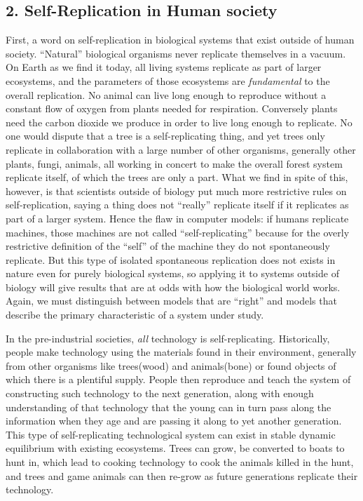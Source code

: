 \documentclass[12pt,a4paper]{amsart}
\numberwithin{equation}{section}
\begin{document}
\subsection{2. Self-Replication in Human
society}\label{self-replication-in-human-society}

First, a word on self-replication in biological systems that exist
outside of human society. ``Natural'' biological organisms never
replicate themselves in a vacuum. On Earth as we find it today, all
living systems replicate as part of larger ecosystems, and the
parameters of those ecosystems are \emph{fundamental} to the overall
replication. No animal can live long enough to reproduce without a
constant flow of oxygen from plants needed for respiration. Conversely
plants need the carbon dioxide we produce in order to live long enough
to replicate. No one would dispute that a tree is a self-replicating
thing, and yet trees only replicate in collaboration with a large number
of other organisms, generally other plants, fungi, animals, all working
in concert to make the overall forest system replicate itself, of which
the trees are only a part. What we find in spite of this, however, is
that scientists outside of biology put much more restrictive rules on
self-replication, saying a thing does not ``really'' replicate itself if
it replicates as part of a larger system. Hence the flaw in computer
models: if humans replicate machines, those machines are not called
``self-replicating'' because for the overly restrictive definition of
the ``self'' of the machine they do not spontaneously replicate. But
this type of isolated spontaneous replication does not exists in nature
even for purely biological systems, so applying it to systems outside of
biology will give results that are at odds with how the biological world
works. Again, we must distinguish between models that are ``right'' and
models that describe the primary characteristic of a system under study.

In the pre-industrial societies, \emph{all} technology is
self-replicating. Historically, people make technology using the
materials found in their environment, generally from other organisms
like trees(wood) and animals(bone) or found objects of which there is a
plentiful supply. People then reproduce and teach the system of
constructing such technology to the next generation, along with enough
understanding of that technology that the young can in turn pass along
the information when they age and are passing it along to yet another
generation. This type of self-replicating technological system can exist
in stable dynamic equilibrium with existing ecosystems. Trees can grow,
be converted to boats to hunt in, which lead to cooking technology to
cook the animals killed in the hunt, and trees and game animals can then
re-grow as future generations replicate their technology.
\end{document}
